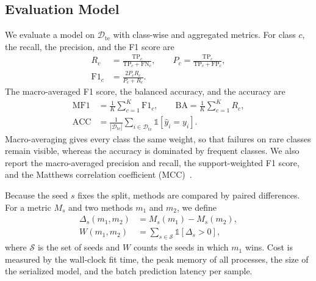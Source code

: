 \subsection{Evaluation Model}
We evaluate a model on $\mathcal{D}_{\mathrm{te}}$ with class-wise and aggregated metrics. For class $c$, the recall, the precision, and the F1 score are
\begin{equation}
\begin{aligned}
R_c&=\frac{\mathrm{TP}_c}{\mathrm{TP}_c+\mathrm{FN}_c},\qquad P_c=\frac{\mathrm{TP}_c}{\mathrm{TP}_c+\mathrm{FP}_c},\\
\mathrm{F1}_c&=\frac{2P_cR_c}{P_c+R_c}.
\end{aligned}
\label{eq:classmetrics}
\end{equation}
The macro-averaged F1 score, the balanced accuracy, and the accuracy are
\begin{equation}
\begin{aligned}
\mathrm{MF1}&=\frac{1}{K}\sum_{c=1}^{K}\mathrm{F1}_c,\qquad \mathrm{BA}=\frac{1}{K}\sum_{c=1}^{K}R_c,\\
\mathrm{ACC}&=\frac{1}{|\mathcal{D}_{\mathrm{te}}|}\sum_{i\in\mathcal{D}_{\mathrm{te}}}\mathbb{1}[\hat{y}_i=y_i].
\end{aligned}
\label{eq:aggmetrics}
\end{equation}
Macro-averaging gives every class the same weight, so that failures on rare classes remain visible, whereas the accuracy is dominated by frequent classes. We also report the macro-averaged precision and recall, the support-weighted F1 score, and the Matthews correlation coefficient (MCC)~\cite{chicco2020}.

Because the seed $s$ fixes the split, methods are compared by paired differences. For a metric $M_s$ and two methods $m_1$ and $m_2$, we define
\begin{equation}
\begin{aligned}
\Delta_s(m_1,m_2)&=M_s(m_1)-M_s(m_2),\\
W(m_1,m_2)&=\sum_{s\in\mathcal{S}}\mathbb{1}[\Delta_s>0],
\end{aligned}
\label{eq:paired}
\end{equation}
where $\mathcal{S}$ is the set of seeds and $W$ counts the seeds in which $m_1$ wins. Cost is measured by the wall-clock fit time, the peak memory of all processes, the size of the serialized model, and the batch prediction latency per sample.

